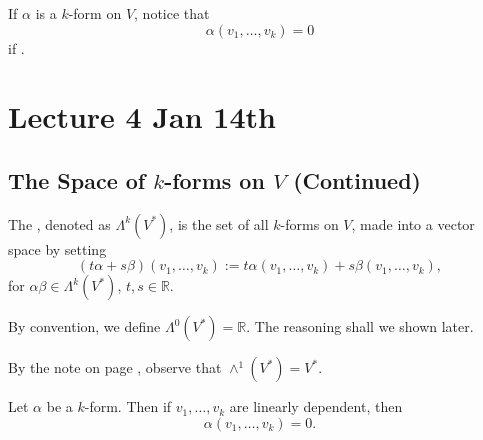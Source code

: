 \documentclass[notoc,notitlepage]{tufte-book}
\begin{document}
\begin{remark}
  If $\alpha$ is a $k$-form on $V$, notice that
  \begin{equation*}
    \alpha(v_1, \ldots, v_k) = 0
  \end{equation*}
  if .
\end{remark}



\chapter{Lecture 4 Jan 14th}%
\label{chp:lecture_4_jan_14th}

\section{The Space of \texorpdfstring{$k$}{k}-forms on \texorpdfstring{$V$}{V} (Continued)}%
\label{sec:the_space_of_k_forms_on_v_continued}

\begin{defn}\label{defn:space_of_k_forms_on_v_}
  The , denoted as $\Lambda^k \left( V^* \right)$, is
  the set of all $k$-forms on $V$, made into a vector space by setting
  \begin{equation*}
    (t\alpha + s\beta)(v_1, \ldots, v_k) :=
      t\alpha(v_1, \ldots, v_k) + s\beta(v_1, \ldots, v_k),
  \end{equation*}
  for $\alpha \beta \in \Lambda^k \left( V^* \right)$, $t, s \in \mathbb{R}$.
\end{defn}

\begin{note}
  By convention, we define $\Lambda^0 \left( V^* \right) = \mathbb{R}$. The reasoning shall
  we shown later. %
\end{note}

\begin{note}
  By the note on page \pageref{remark:permutations}, observe that
  $\wedge^1 \left( V^* \right) = V^*$.
\end{note}

\begin{propo}\label{propo:a_k_form_is_equivalently_0_if_its_arguments_are_linearly_dependent}
  Let $\alpha$ be a $k$-form. Then if $v_1, \ldots, v_k$ are linearly dependent, then
  \begin{equation*}
    \alpha(v_1, \ldots, v_k) = 0.
  \end{equation*}
\end{propo}
\end{document}
